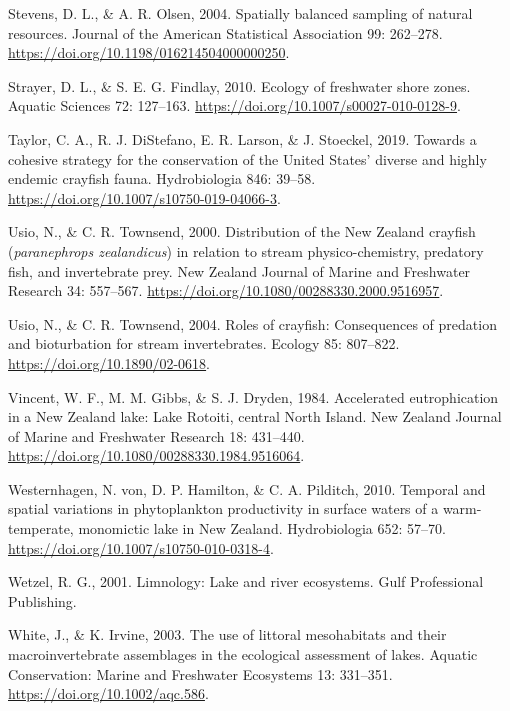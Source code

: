 \documentclass[
  letterpaper,
  DIV=11,
  numbers=noendperiod]{scrartcl}
\newlength{\cslhangindent}
\newenvironment{CSLReferences}[2] %
 {\begin{list}{}{%
  \setlength{\itemindent}{0pt}
  \setlength{\leftmargin}{0pt}
  \setlength{\parsep}{0pt}
  \ifodd #1
   \setlength{\leftmargin}{\cslhangindent}
   \setlength{\itemindent}{-1\cslhangindent}
  \fi
  \setlength{\itemsep}{#2\baselineskip}}}
 {\end{list}}
\begin{document}
\begin{CSLReferences}{0}{1}
Stevens, D. L., \& A. R. Olsen, 2004. Spatially balanced sampling of
natural resources. Journal of the American Statistical Association 99:
262--278. \url{https://doi.org/10.1198/016214504000000250}.

Strayer, D. L., \& S. E. G. Findlay, 2010. Ecology of freshwater shore
zones. Aquatic Sciences 72: 127--163.
\url{https://doi.org/10.1007/s00027-010-0128-9}.

Taylor, C. A., R. J. DiStefano, E. R. Larson, \& J. Stoeckel, 2019.
Towards a cohesive strategy for the conservation of the {United States}'
diverse and highly endemic crayfish fauna. Hydrobiologia 846: 39--58.
\url{https://doi.org/10.1007/s10750-019-04066-3}.

Usio, N., \& C. R. Townsend, 2000. Distribution of the {New Zealand}
crayfish (\emph{paranephrops zealandicus}) in relation to stream
physico-chemistry, predatory fish, and invertebrate prey. New Zealand
Journal of Marine and Freshwater Research 34: 557--567.
\url{https://doi.org/10.1080/00288330.2000.9516957}.

Usio, N., \& C. R. Townsend, 2004. Roles of crayfish: Consequences of
predation and bioturbation for stream invertebrates. Ecology 85:
807--822. \url{https://doi.org/10.1890/02-0618}.

Vincent, W. F., M. M. Gibbs, \& S. J. Dryden, 1984. Accelerated
eutrophication in a {New Zealand} lake: {Lake Rotoiti}, central {North
Island}. New Zealand Journal of Marine and Freshwater Research 18:
431--440. \url{https://doi.org/10.1080/00288330.1984.9516064}.

Westernhagen, N. von, D. P. Hamilton, \& C. A. Pilditch, 2010. Temporal
and spatial variations in phytoplankton productivity in surface waters
of a warm-temperate, monomictic lake in {New Zealand}. Hydrobiologia
652: 57--70. \url{https://doi.org/10.1007/s10750-010-0318-4}.

Wetzel, R. G., 2001. Limnology: Lake and river ecosystems. Gulf
Professional Publishing.

White, J., \& K. Irvine, 2003. The use of littoral mesohabitats and
their macroinvertebrate assemblages in the ecological assessment of
lakes. Aquatic Conservation: Marine and Freshwater Ecosystems 13:
331--351. \url{https://doi.org/10.1002/aqc.586}.


\end{CSLReferences}
\end{document}
